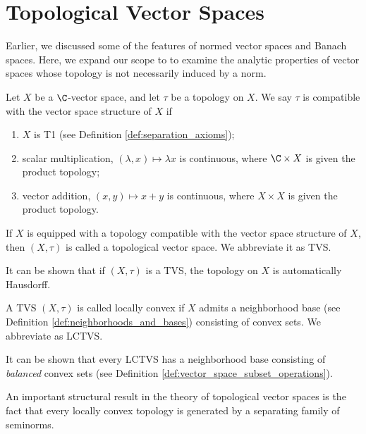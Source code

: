 \section{Topological Vector Spaces}%
Earlier, we discussed some of the features of normed vector spaces and Banach spaces. Here, we expand our scope to to examine the analytic properties of vector spaces whose topology is not necessarily induced by a norm. 
\begin{definition}\label{def:tvs}
  Let $X$ be a $\C$-vector space, and let $\tau$ be a topology on $X$. We say $\tau$ is compatible with the vector space structure of $X$ if
  \begin{enumerate}[(1)]
    \item $X$ is T1 (see Definition \ref{def:separation_axioms});
    \item scalar multiplication, $(\lambda,x)\mapsto \lambda x$ is continuous, where $\C\times X$ is given the product topology;
    \item vector addition, $(x,y) \mapsto x + y$ is continuous, where $X\times X$ is given the product topology.
  \end{enumerate}
  If $X$ is equipped with a topology compatible with the vector space structure of $X$, then $(X,\tau)$ is called a topological vector space. We abbreviate it as TVS.
\end{definition}
\begin{remark}
  It can be shown that if $(X,\tau)$ is a TVS, the topology on $X$ is automatically Hausdorff.
\end{remark}
\begin{definition}\label{def:lctvs}
A TVS $\left(X,\tau\right)$ is called locally convex if $X$ admits a neighborhood base (see Definition \ref{def:neighborhoods_and_bases}) consisting of convex sets. We abbreviate as LCTVS.\newline

It can be shown that every LCTVS has a neighborhood base consisting of \textit{balanced} convex sets (see Definition \ref{def:vector_space_subset_operations}).
\end{definition}
An important structural result in the theory of topological vector spaces is the fact that every locally convex topology is generated by a separating family of seminorms.
